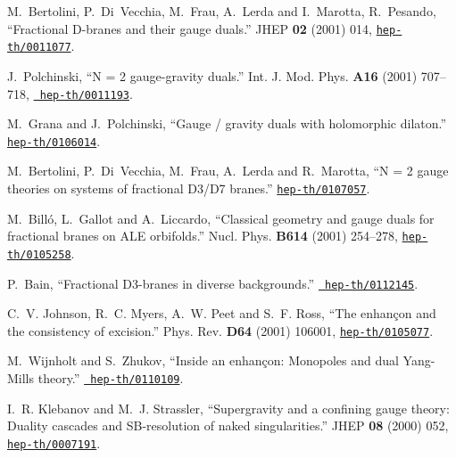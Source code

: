 \documentclass[a4paper,11pt]{article}
\begin{document}
\begin{thebibliography}{10}
M.~Bertolini, P.~Di~Vecchia, M.~Frau, A.~Lerda and I.~Marotta, R.~Pesando,
  ``Fractional D-branes and their gauge duals.'' JHEP {\bf 02} (2001) 014,
  \href{http://xxx.lanl.gov/abs/hep-th/0011077}{{\tt hep-th/0011077}}.

J.~Polchinski, ``N = 2 gauge-gravity duals.'' Int. J. Mod. Phys. {\bf A16}
  (2001) 707--718, \href{http://xxx.lanl.gov/abs/hep-th/0011193}{{\tt
  hep-th/0011193}}. %

M.~Grana and J.~Polchinski, ``Gauge / gravity duals with holomorphic dilaton.''
  \href{http://xxx.lanl.gov/abs/hep-th/0106014}{{\tt hep-th/0106014}}.

M.~Bertolini, P.~Di~Vecchia, M.~Frau, A.~Lerda and R.~Marotta, ``N = 2 gauge
  theories on systems of fractional D3/D7 branes.''
  \href{http://xxx.lanl.gov/abs/hep-th/0107057}{{\tt hep-th/0107057}}.

M.~Bill\'o, L.~Gallot and A.~Liccardo, ``Classical geometry and gauge duals for
  fractional branes on ALE orbifolds.'' Nucl. Phys. {\bf B614} (2001) 254--278,
  \href{http://xxx.lanl.gov/abs/hep-th/0105258}{{\tt hep-th/0105258}}.

P.~Bain, ``Fractional D3-branes in diverse backgrounds.''
  \href{http://xxx.lanl.gov/abs/http://arXiv.org/abs/hep-th/0112145}{{\tt
  hep-th/0112145}}. %

C.~V. Johnson, R.~C. Myers, A.~W. Peet and S.~F. Ross, ``The enhan\c{c}on and
  the consistency of excision.'' Phys. Rev. {\bf D64} (2001) 106001,
  \href{http://xxx.lanl.gov/abs/hep-th/0105077}{{\tt hep-th/0105077}}.

M.~Wijnholt and S.~Zhukov, ``Inside an enhan\c{c}on: Monopoles and dual
  {Yang-Mills} theory.'' \href{http://xxx.lanl.gov/abs/hep-th/0110109}{{\tt
  hep-th/0110109}}. %

I.~R. Klebanov and M.~J. Strassler, ``Supergravity and a confining gauge
  theory: Duality cascades and {\myHighlight{$\chi$}\coordHE{}}{SB}-resolution of naked
  singularities.'' JHEP {\bf 08} (2000) 052,
  \href{http://xxx.lanl.gov/abs/hep-th/0007191}{{\tt hep-th/0007191}}.


\end{thebibliography}
\end{document}
